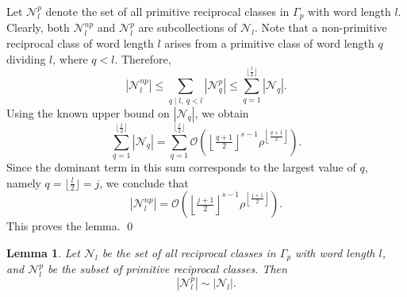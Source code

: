 \documentclass[11pt]{amsart}
\renewenvironment{proof}{{\bfseries Proof.}}{\qed}
\numberwithin{equation}{section}
\newtheorem{lemma}[theorem]{Lemma}
\theoremstyle{definition}
\newcommand{\lemref}[1]{Lemma~\ref{#1}}
\numberwithin{equation}{section}
\begin{document}
	\begin{proof}
		Let $\mathcal{N}^{p}_{l}$ denote the set of all primitive reciprocal classes in $\Gamma_p$ with word length $l$. Clearly, both $\mathcal{N}^{np}_{l}$ and $\mathcal{N}^{p}_{l}$ are subcollections of $\mathcal{N}_{l}$. Note that a non-primitive reciprocal class of word length $l$ arises from a primitive class of word length $q$ dividing $l$, where $q < l$. Therefore,
		\[
		|\mathcal{N}^{np}_{l}| \leq \sum_{q \mid l,~q < l} |\mathcal{N}^{p}_{q}| \leq \sum_{q = 1}^{\lfloor \frac{l}{2} \rfloor} |\mathcal{N}_{q}|.
		\]
		Using the known upper bound on $|\mathcal{N}_q|$, we obtain
		\[
		\sum_{q=1}^{\lfloor \frac{l}{2} \rfloor} |\mathcal{N}_{q}| = \sum_{q=1}^{\lfloor \frac{l}{2} \rfloor} \mathcal{O}\left(\left\lfloor \tfrac{q+1}{2} \right\rfloor^{s-1} \rho^{\left\lfloor \tfrac{q+1}{2} \right\rfloor} \right).
		\]
		Since the dominant term in this sum corresponds to the largest value of $q$, namely $q = \lfloor \tfrac{l}{2} \rfloor = j$, we conclude that
		\[
		|\mathcal{N}^{np}_{l}| = \mathcal{O}\left(\left\lfloor \tfrac{j+1}{2} \right\rfloor^{s-1} \rho^{\left\lfloor \tfrac{j+1}{2} \right\rfloor} \right).
		\]
		This proves the lemma. 
	\end{proof}
	
		
		
		
		
		
		
		
		
	\begin{lemma}\label{prim}
			Let $\mathcal{N}_{l}$ be the set of all reciprocal classes in $\Gamma_p$ with word length $l$, and $\mathcal{N}^{p}_{l}$ be the subset of primitive reciprocal classes. Then \[
		|\mathcal{N}^{p}_{l}| \sim |\mathcal{N}_{l}|.
		\]
		
	\end{lemma}
	
\end{document}
